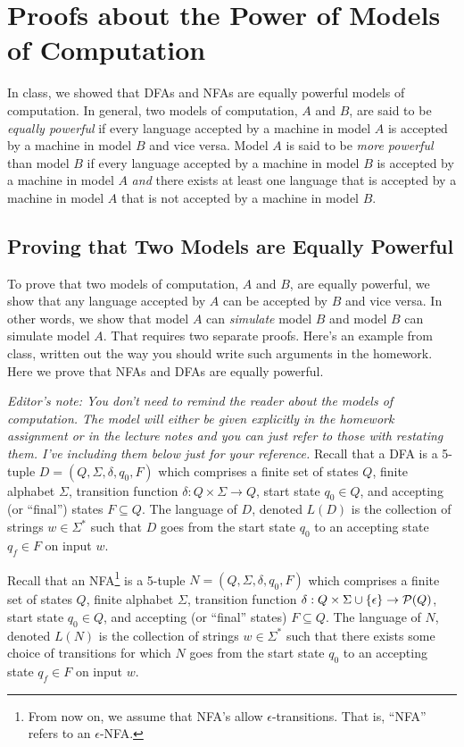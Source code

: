 \documentclass[12pt]{article}
\begin{document}
\section{Proofs about the Power of Models of Computation}

In class, we showed that DFAs and NFAs are equally powerful models of computation.  In general, two models of computation, $A$ and $B$, are said to be \emph{equally powerful} if every language accepted by a machine in model $A$ is accepted by a machine in model $B$ and vice versa.  Model $A$ is said to be \emph{more powerful} than model $B$ if every language accepted by a machine in model $B$ is accepted by a machine in model $A$ \emph{and} there exists at least one language that is accepted by a machine in model $A$ that is not accepted by a machine in model $B$.

\subsection{Proving that Two Models are Equally Powerful}

To prove that two models of computation, $A$ and $B$, are equally powerful, we show that any language accepted by $A$ can be accepted by $B$ and vice versa.  In other words, we show
that model $A$ can \emph{simulate} model $B$ and model $B$ can simulate model $A$.  That requires two separate proofs.  Here's an example from class, written out the way you should write such arguments in the homework.  Here we prove that NFAs and DFAs are equally powerful.

\emph{Editor's note:  You don't need to remind the reader about the models of computation.  The model will either be given explicitly in the homework assignment or in the lecture notes and you can just refer to those with restating them.  I've including them below just for your reference.}
Recall that a DFA is a 5-tuple $D = (Q, \Sigma, \delta, q_0, F)$ which comprises a finite set of states $Q$, finite alphabet $\Sigma$, transition function $\delta: Q \times \Sigma \rightarrow Q$, start state $q_0 \in Q$, and accepting (or ``final'') states $F \subseteq Q$.  The language of $D$, denoted $L(D)$ is the collection of strings $w \in \Sigma^{*}$ such that $D$ goes from the start state $q_0$ to an accepting state $q_f \in F$ on input $w$.

Recall that an NFA\footnote{From now on, we assume that NFA's allow $\epsilon$-transitions.  That is, ``NFA'' refers to an $\epsilon$-NFA.} is a 5-tuple $N =  (Q, \Sigma, \delta, q_0, F)$ which comprises a finite set of states $Q$, finite alphabet $\Sigma$, 
transition function $\delta: Q \times \Sigma \cup \{ \epsilon \} \rightarrow {\cal P}(Q)$, start state $q_0 \in Q$, and accepting (or ``final'' states) $F \subseteq Q$.  
The language of $N$, denoted $L(N)$ is the collection of strings $w \in \Sigma^{*}$ such that there exists some choice of transitions for which $N$ goes from the start state $q_0$ to an accepting state $q_f \in F$ on input $w$.
	
\end{document}
